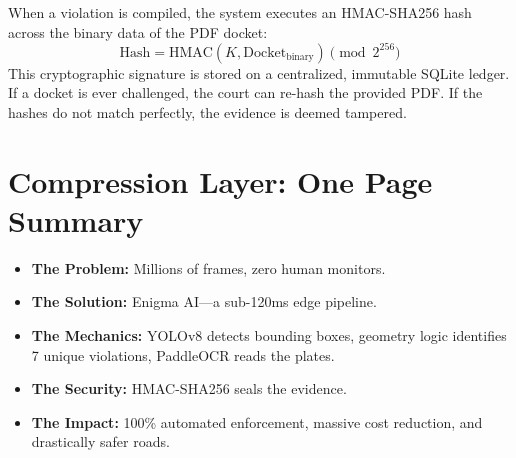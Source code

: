 \documentclass[12pt,a4paper]{article}
\begin{document}
\indent When a violation is compiled, the system executes an HMAC-SHA256 hash across the binary data of the PDF docket:
\begin{equation}
    \text{Hash} = \text{HMAC}(K, \text{Docket}_{\text{binary}}) \pmod{2^{256}}
\end{equation}
\indent This cryptographic signature is stored on a centralized, immutable SQLite ledger. If a docket is ever challenged, the court can re-hash the provided PDF. If the hashes do not match perfectly, the evidence is deemed tampered.

\section{Compression Layer: One Page Summary}
\begin{itemize}
    \item \textbf{The Problem:} Millions of frames, zero human monitors.
    \item \textbf{The Solution:} Enigma AI—a sub-120ms edge pipeline.
    \item \textbf{The Mechanics:} YOLOv8 detects bounding boxes, geometry logic identifies 7 unique violations, PaddleOCR reads the plates.
    \item \textbf{The Security:} HMAC-SHA256 seals the evidence.
    \item \textbf{The Impact:} 100\% automated enforcement, massive cost reduction, and drastically safer roads.
\end{itemize}
\end{document}
